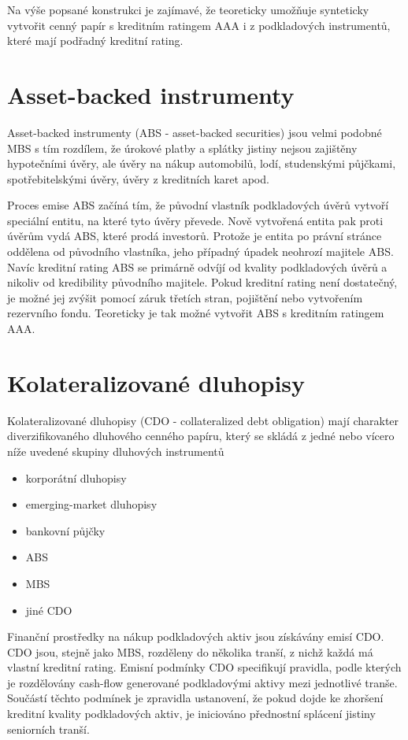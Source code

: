 \documentclass[a4paper]{book}
\begin{document}
Na výše popsané konstrukci je zajímavé, že teoreticky umožňuje synteticky vytvořit cenný papír s kreditním ratingem AAA i z podkladových instrumentů, které mají podřadný kreditní rating.

\section{Asset-backed instrumenty}

Asset-backed instrumenty (ABS - asset-backed securities) jsou velmi podobné MBS s tím rozdílem, že úrokové platby a splátky jistiny nejsou zajištěny hypotečními úvěry, ale úvěry na nákup automobilů, lodí, studenskými půjčkami, spotřebitelskými úvěry, úvěry z kreditních karet apod.

Proces emise ABS začíná tím, že původní vlastník podkladových úvěrů vytvoří speciální entitu, na které tyto úvěry převede. Nově vytvořená entita pak proti úvěrům vydá ABS, které prodá investorů. Protože je entita po právní stránce oddělena od původního vlastníka, jeho případný úpadek neohrozí majitele ABS. Navíc kreditní rating ABS se primárně odvíjí od kvality podkladových úvěrů a nikoliv od kredibility původního majitele. Pokud kreditní rating není dostatečný, je možné jej zvýšit pomocí záruk třetích stran, pojištění nebo vytvořením rezervního fondu. Teoreticky je tak možné vytvořit ABS s kreditním ratingem AAA.

\section{Kolateralizované dluhopisy}

Kolateralizované dluhopisy (CDO - collateralized debt obligation) mají charakter diverzifikovaného dluhového cenného papíru, který se skládá z jedné nebo vícero níže uvedené skupiny dluhových instrumentů
\begin{itemize}
\item korporátní dluhopisy
\item emerging-market dluhopisy
\item bankovní půjčky
\item ABS
\item MBS
\item jiné CDO
\end{itemize}
Finanční prostředky na nákup podkladových aktiv jsou získávány emisí CDO. CDO jsou, stejně jako MBS, rozděleny do několika tranší, z nichž každá má vlastní kreditní rating. Emisní podmínky CDO specifikují pravidla, podle kterých je rozdělovány cash-flow generované podkladovými aktivy mezi jednotlivé tranše. Součástí těchto podmínek je zpravidla ustanovení, že pokud dojde ke zhoršení kreditní kvality podkladových aktiv, je iniciováno přednostní splácení jistiny seniorních tranší.
\end{document}
